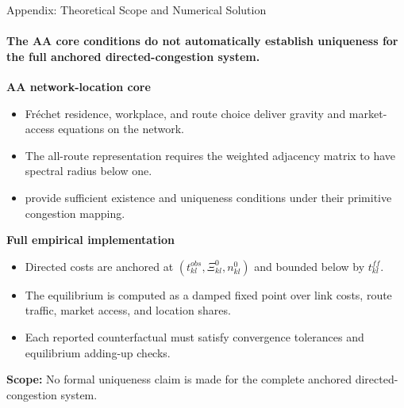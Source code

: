\documentclass[11pt,aspectratio=169]{beamer}
\newcommand{\navback}[1]{\par\vspace{0.35em}\noindent\hfill\hyperlink{#1}{\beamerreturnbutton{back}}}
\begin{document}
\begin{frame}[label=appexist]{Appendix: Theoretical Scope and Numerical Solution}
\framesubtitle{The AA core conditions do not automatically establish uniqueness for the full anchored directed-congestion system.}
\small\textbf{AA network-location core}\par
\vspace{0.12em}
\begin{itemize}\footnotesize\setlength\itemsep{0.24em}
  \item Fr\'echet residence, workplace, and route choice deliver gravity and market-access equations on the network.
  \item The all-route representation requires the weighted adjacency matrix to have spectral radius below one.
  \item \citet[Proposition~1]{allenarkolakis2022} provide sufficient existence and uniqueness conditions under their primitive congestion mapping.
\end{itemize}
\vspace{0.25em}
\small\textbf{Full empirical implementation}\par
\vspace{0.12em}
\begin{itemize}\footnotesize\setlength\itemsep{0.24em}
  \item Directed costs are anchored at $(t_{kl}^{obs},\Xi_{kl}^{0},n_{kl}^{0})$ and bounded below by $t_{kl}^{ff}$.
  \item The equilibrium is computed as a damped fixed point over link costs, route traffic, market access, and location shares.
  \item Each reported counterfactual must satisfy convergence tolerances and equilibrium adding-up checks.
\end{itemize}
\vspace{0.20em}
\begin{center}
\footnotesize\textbf{Scope:} No formal uniqueness claim is made for the complete anchored directed-congestion system.
\end{center}
\navback{equilibrium}
\end{frame}

\end{document}
